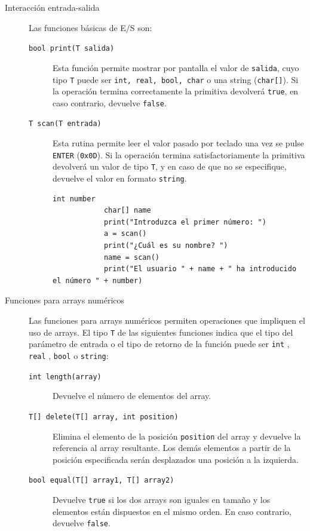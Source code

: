 \documentclass[11pt, english]{article}
\begin{document}
	\begin{description}
		\item [Interacción entrada-salida] Las funciones básicas de E/S son:
		\begin{description}
			
			\item[\texttt{bool print(T salida)}] Esta función permite mostrar por pantalla el valor de \texttt{salida}, cuyo tipo \texttt{T} puede ser \texttt{int, real, bool, char} o una string (\texttt{char[]}). Si la operación termina correctamente la primitiva devolverá \texttt{true}, en caso contrario, devuelve \texttt{false}.
			\item[\texttt{T scan(T entrada)}] Esta rutina permite leer el valor pasado por teclado una vez se pulse \texttt{ENTER} (\texttt{0x0D}). Si la operación termina satisfactoriamente la primitiva devolverá un valor de tipo  \texttt{T}, y en caso de que no se especifique, devuelve el valor en formato \texttt{string}.
			
			\begin{lstlisting}[caption=Ejemplo de uso de la función \texttt{print()} y \texttt{scan()}]
			int number
			char[] name
			print("Introduzca el primer número: ")
			a = scan()
			print("¿Cuál es su nombre? ")
			name = scan()
			print("El usuario " + name + " ha introducido el número " + number)
			\end{lstlisting}
		\end{description}
		
		
		\item [Funciones para arrays numéricos] Las funciones para arrays numéricos permiten operaciones que impliquen el uso de arrays. El tipo \texttt{T} de las siguientes funciones indica que el tipo del parámetro de entrada o el tipo de retorno de la función puede ser \texttt{int} ,  \texttt{real} ,  \texttt{bool} o \texttt{string}:
		
		\begin{description}
			\item [\texttt{int length(array)}] Devuelve el número de elementos del array.
			\item [\texttt{T[] delete(T[] array, int position)}] Elimina el elemento de la posición \texttt{position} del array y devuelve la referencia al array resultante. Los demás elementos a partir de la posición especificada serán desplazados una posición a la izquierda.
			\item [\texttt{bool equal(T[] array1, T[] array2)}] Devuelve \texttt{true} si los dos arrays son iguales en tamaño y los elementos están dispuestos en el mismo orden. En caso contrario, devuelve \texttt{false}.
		\end{description}
	\end{description}
	
\end{document}
